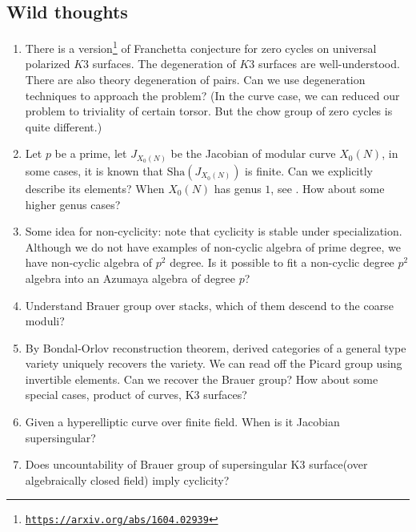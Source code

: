 \documentclass[8pt]{amsart}
\begin{document}
\subsection{Wild thoughts}
\begin{enumerate}
\item There is a version\footnote{\href{https://arxiv.org/abs/1604.02939}{\texttt{https://arxiv.org/abs/1604.02939}}} of Franchetta conjecture for zero cycles on universal polarized $K3$ surfaces. The degeneration of $K3$ surfaces are well-understood. There are also theory degeneration of pairs. Can we use degeneration techniques to approach the problem? (In the curve case, we can reduced our problem to triviality of certain torsor. But the chow group of zero cycles is quite different.)
\item Let $p$ be a prime, let $J_{X_0(N)}$ be the Jacobian of modular curve $X_0(N)$, in some cases, it is known that $\mathrm{Sha}(J_{X_0(N)})$ is finite. Can we explicitly describe its elements? When $X_0(N)$ has genus $1$, see \cite{Mazur}. How about some higher genus cases?
\item\label{c} Some idea for non-cyclicity: note that cyclicity is stable under specialization. Although we do not have examples of non-cyclic algebra of prime degree, we have non-cyclic algebra of $p^2$ degree. Is it possible to fit a non-cyclic degree $p^2$ algebra into an Azumaya algebra of degree $p$?
\item Understand Brauer group over stacks, which of them descend to the coarse moduli?
\item By Bondal-Orlov reconstruction theorem, derived categories of a general type variety uniquely recovers the variety. We can read off the Picard group using invertible elements. Can we recover the Brauer group? How about some special cases, product of curves, K3 surfaces?
\item Given a hyperelliptic curve over finite field. When is it Jacobian supersingular?
\item Does uncountability of Brauer group of supersingular K3 surface(over algebraically closed field) imply cyclicity?
\end{enumerate}




\end{document}
